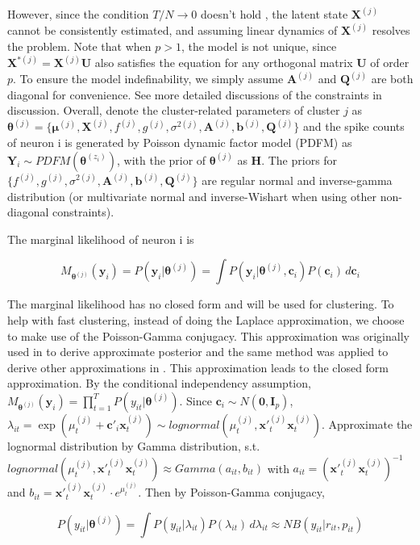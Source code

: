 \documentclass{article}
\begin{document}
	However, since the condition $T/N \rightarrow 0$ doesn’t hold \citep{Johnstone2009}, the latent state $\bm{X}^{(j)}$ cannot be consistently estimated, and assuming linear dynamics of $\bm{X}^{(j)}$ resolves the problem. Note that when $p>1$, the model is not unique, since $\bm{X}^{*(j)} = \bm{X}^{(j)}\bm{U}$ also satisfies the equation for any orthogonal matrix $\bm{U}$ of order $p$. To ensure the model indefinability, we simply assume $\bm{A}^{(j)}$ and $\bm{Q}^{(j)}$
	are both diagonal for convenience. See more detailed discussions of the constraints in discussion. Overall, denote the cluster-related parameters of cluster $j$ as $\bm{\theta}^{(j)}= \{\bm{\mu}^{(j)}, \bm{X}^{(j)}, f^{(j)}, g^{(j)}, \sigma^{2(j)},\bm{A}^{(j)}, \bm{b}^{(j)}, \bm{Q}^{(j)}\}$ and the spike counts of neuron i is generated by Poisson dynamic factor model (PDFM) as $\bm{Y}_i\sim PDFM(\bm{\theta}^{(z_i)})$, with the prior of $\bm{\theta}^{(j)}$ as $\bm{H}$. The priors for $\{f^{(j)}, g^{(j)}, \sigma^{2(j)},\bm{A}^{(j)}, \bm{b}^{(j)}, \bm{Q}^{(j)}\}$ are regular  normal and inverse-gamma distribution (or multivariate normal and inverse-Wishart when using other non-diagonal constraints).

	The marginal likelihood of neuron i is
	
	$$M_{\bm{\theta}^{(j)}}(\bm{y}_i) = P(\bm{y}_i|\bm{\theta}^{(j)}) = \int P(\bm{y}_i|\bm{\theta}^{(j)}, \bm{c}_i)P(\bm{c}_i)\,d\bm{c}_i$$
	
	The marginal likelihood has no closed form and will be used for clustering. To help with fast clustering, instead of doing the Laplace approximation, we choose to make use of the Poisson-Gamma conjugacy. This approximation was originally used in \citet{El-Sayyad1973} to derive approximate posterior and the same method was applied to derive other approximations in \citet{Chan2009}. This approximation leads to the closed form approximation. By the conditional independency assumption, $M_{\bm{\theta}^{(j)}}(\bm{y}_i)=\prod_{t=1}^{T}P(y_{it}|\bm{\theta}^{(j)})$. Since $\bm{c}_i\sim N(\bm{0},\bm{I}_p)$, $\lambda_{it} = \exp(\mu_t^{(j)} + \bm{c}'_i\bm{x}^{(j)}_t)\sim lognormal(\mu_t^{(j)}, \bm{x}'^{(j)}_t\bm{x}^{(j)}_t)$. Approximate the lognormal distribution by Gamma distribution, s.t. $lognormal(\mu_t^{(j)}, \bm{x}'^{(j)}_t\bm{x}^{(j)}_t) \approx Gamma(a_{it}, b_{it})$ with $a_{it} = (\bm{x}'^{(j)}_t\bm{x}^{(j)}_t)^{-1}$ and $b_{it} = \bm{x}'^{(j)}_t\bm{x}^{(j)}_t\cdot e^{\mu_t^{(j)}}$. Then by Poisson-Gamma conjugacy,
	
	$$
	P(y_{it}|\bm{\theta}^{(j)}) = \int P(y_{it}|\lambda_{it})P(\lambda_{it})\,d\lambda_{it}\approx NB(y_{it}|r_{it}, p_{it})
	$$
	
\end{document}
